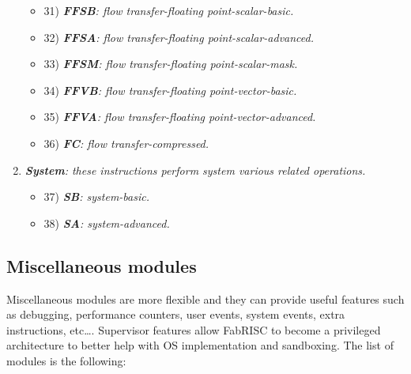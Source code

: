 \begin{enumerate}
\begin{itemize}
                    \item 31) \textit{\textbf{FFSB}: flow transfer-floating point-scalar-basic.}
                    \item 32) \textit{\textbf{FFSA}: flow transfer-floating point-scalar-advanced.}
                    \item 33) \textit{\textbf{FFSM}: flow transfer-floating point-scalar-mask.}

                    \item 34) \textit{\textbf{FFVB}: flow transfer-floating point-vector-basic.}
                    \item 35) \textit{\textbf{FFVA}: flow transfer-floating point-vector-advanced.}

                    \item 36) \textit{\textbf{FC}: flow transfer-compressed.}

                \end{itemize}

            \item \textit{\textbf{System}: these instructions perform system various related operations.}

                \begin{itemize}

                    \item 37) \textit{\textbf{SB}: system-basic.}
                    \item 38) \textit{\textbf{SA}: system-advanced.}

                \end{itemize}

        \end{enumerate}

    \subsection{Miscellaneous modules}

        Miscellaneous modules are more flexible and they can provide useful features such as debugging, performance counters, user events, system events, extra instructions, etc\ldots. Supervisor features allow FabRISC to become a privileged architecture to better help with OS implementation and sandboxing. The list of modules is the following:

